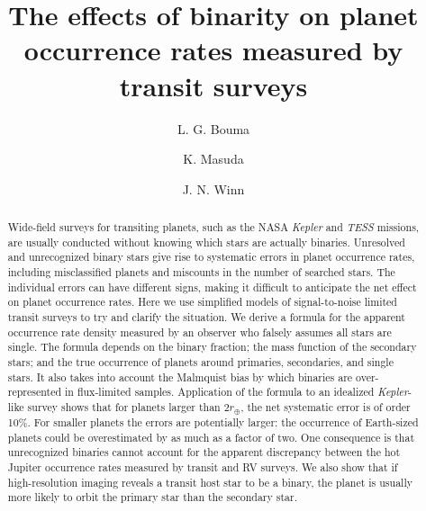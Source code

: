 \documentclass[12pt,modern]{aastex61}
\begin{document}
    
\title{ The effects of binarity on planet occurrence rates measured by transit 
surveys}
%
%
\author{L. G. Bouma}
\author{K. Masuda}
\author{J. N. Winn}
%
%
\begin{abstract}
%
Wide-field surveys for transiting planets, such as the NASA {\it Kepler}
and {\it TESS} missions, are usually conducted without knowing which stars
are actually binaries. Unresolved and unrecognized binary stars give rise to 
systematic errors in planet occurrence rates, including misclassified planets 
and miscounts in the number of searched stars. The individual errors can have 
different signs, making it difficult to anticipate the net effect on planet 
occurrence rates. Here we use simplified models of signal-to-noise limited 
transit surveys to try and clarify the situation. We derive a formula for the 
apparent occurrence rate density measured by an observer who falsely assumes 
all stars are single. The formula depends on the binary fraction; the 
mass function of the secondary stars; and the true occurrence of planets 
around primaries, secondaries, and single stars. It also takes into account 
the Malmquist bias by which binaries are over-represented in flux-limited 
samples. Application of the formula to an idealized {\it Kepler}-like survey 
shows that for planets larger than $2r_\oplus$, the net systematic error is of 
order 10\%. For smaller planets the errors are potentially larger: the 
occurrence of Earth-sized planets could be overestimated by as much as a 
factor of two. One consequence is that unrecognized binaries cannot account 
for the apparent discrepancy between the hot Jupiter occurrence rates measured 
by transit and RV surveys. We also show that if high-resolution imaging 
reveals a transit host star to be a binary, the planet is usually more likely 
to orbit the primary star than the secondary star.
%
\end{abstract}
%
%
%

%
\end{document}
